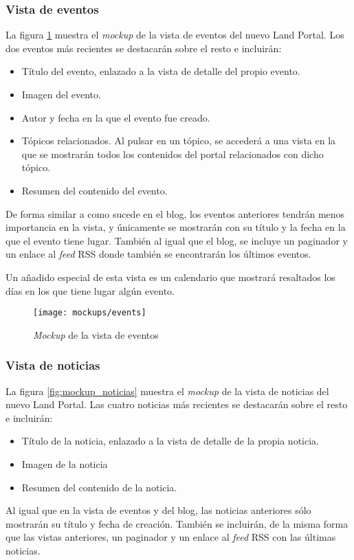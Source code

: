\subsubsection{Vista de eventos}
\label{chapter04:mockup_eventos}
La figura \ref{fig:mockup_eventos} muestra el \textit{mockup} de la vista de eventos del nuevo Land Portal.  Los dos eventos más recientes se destacarán sobre el resto e incluirán:
\begin{itemize}
	\item Título del evento, enlazado a la vista de detalle del propio evento.
	\item Imagen del evento.
	\item Autor y fecha en la que el evento fue creado.
	\item Tópicos relacionados.  Al pulsar en un tópico, se accederá a una vista en la que se mostrarán todos los contenidos del portal relacionados con dicho tópico.
	\item Resumen del contenido del evento.
\end{itemize}
De forma similar a como sucede en el blog, los eventos anteriores tendrán menos importancia en la vista, y únicamente se mostrarán con su título y la fecha en la que el evento tiene lugar.  También al igual que el blog, se incluye un paginador y un enlace al \textit{feed} RSS donde también se encontrarán los últimos eventos.

Un añadido especial de esta vista es un calendario que mostrará resaltados los días en los que tiene lugar algún evento.
\begin{figure}[h]
	\centering
	\texttt{[image: mockups/events]}
	\caption{\textit{Mockup} de la vista de eventos}
	\label{fig:mockup_eventos}
\end{figure}


\subsubsection{Vista de noticias}
\label{chapter04:mockup_noticias}
La figura \ref{fig:mockup_noticias} muestra el \textit{mockup} de la vista de noticias del nuevo Land Portal.  Las cuatro noticias más recientes se destacarán sobre el resto e incluirán:
\begin{itemize}
	\item Título de la noticia, enlazado a la vista de detalle de la propia noticia.
	\item Imagen de la noticia
	\item Resumen del contenido de la noticia.
\end{itemize}
Al igual que en la vista de eventos y del blog, las noticias anteriores sólo mostrarán su título y fecha de creación.  También se incluirán, de la misma forma que las vistas anteriores, un paginador y un enlace al \textit{feed} RSS con las últimas noticias.

